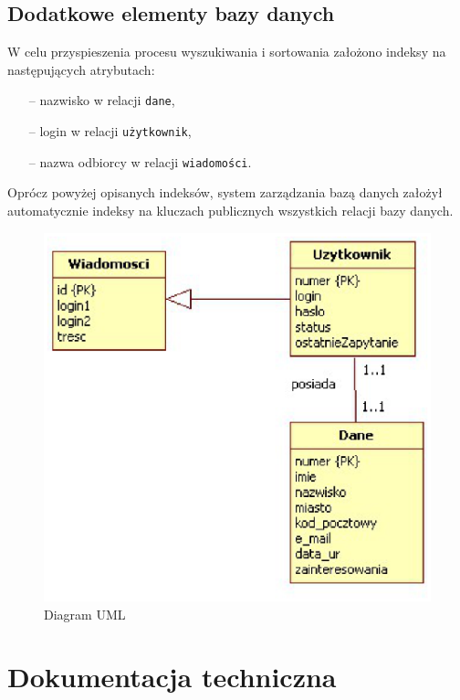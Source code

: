 \documentclass[a4paper,12pt]{article}
\begin{document}
\subsection[Dodatkowe elementy bazy danych]{Dodatkowe elementy bazy danych}
W celu przyspieszenia procesu wyszukiwania i sortowania założono indeksy na następujących atrybutach:
\begin{itemize}
    \item[--] nazwisko w relacji \texttt{dane},
    \item[--] login w relacji \texttt{użytkownik},
    \item[--] nazwa odbiorcy w relacji \texttt{wiadomości}.
\end{itemize}
Oprócz powyżej opisanych indeksów, system zarządzania bazą danych założył automatycznie indeksy na kluczach publicznych
wszystkich relacji bazy danych.
\newpage
\begin{center}
	\begin{figure}
	  \caption{Diagram UML}
	    \label{fig:Diagram}
	      \begin{center}
	        \includegraphics[scale=0.55]{Model.eps}
	      \end{center}
    \end{figure}
\end{center}

\section[Dokumentacja techniczna]{Dokumentacja techniczna}
\end{document}

